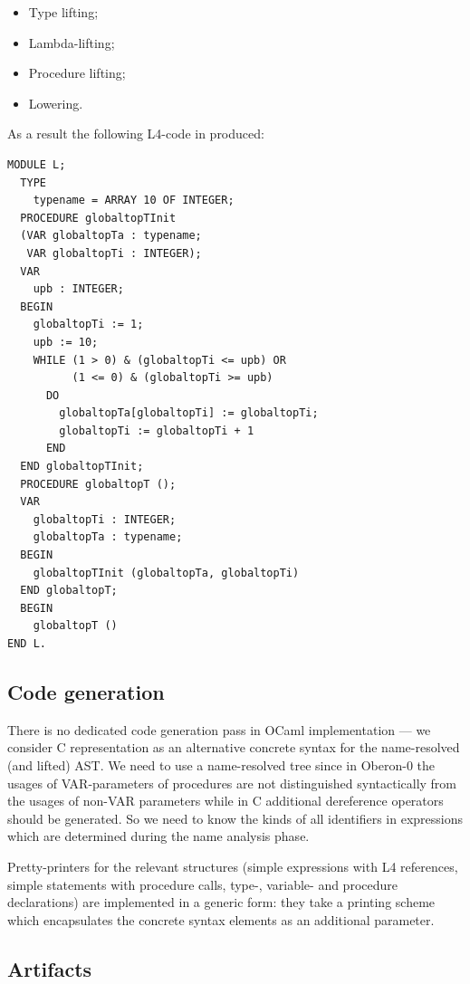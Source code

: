 \begin{itemize}
\item Type lifting;
\item Lambda-lifting;
\item Procedure lifting;
\item Lowering.
\end{itemize}

As a result the following L4-code in produced:

\begin{lstlisting}[language=oberon0]
MODULE L;
  TYPE
    typename = ARRAY 10 OF INTEGER;
  PROCEDURE globaltopTInit 
  (VAR globaltopTa : typename; 
   VAR globaltopTi : INTEGER);
  VAR
    upb : INTEGER;
  BEGIN
    globaltopTi := 1; 
    upb := 10; 
    WHILE (1 > 0) & (globaltopTi <= upb) OR 
          (1 <= 0) & (globaltopTi >= upb)
      DO
        globaltopTa[globaltopTi] := globaltopTi; 
        globaltopTi := globaltopTi + 1
      END
  END globaltopTInit;
  PROCEDURE globaltopT ();
  VAR
    globaltopTi : INTEGER;
    globaltopTa : typename;
  BEGIN
    globaltopTInit (globaltopTa, globaltopTi)
  END globaltopT;
  BEGIN
    globaltopT ()
END L.
\end{lstlisting}

\subsection{Code generation}

There is no dedicated code generation pass in OCaml implementation --- we consider C representation
as an alternative concrete syntax for the name-resolved (and lifted) AST. We need to use a name-resolved
tree since in Oberon-0 the usages of VAR-parameters of procedures are not distinguished syntactically from the usages
of non-VAR parameters while in C additional dereference operators should be generated. So we need to know
the kinds of all identifiers in expressions which are determined during the name analysis phase.

Pretty-printers for the relevant structures (simple expressions with L4 references, simple statements with procedure calls, 
type-, variable- and procedure declarations) are implemented in a generic form: they take a
printing scheme which encapsulates the concrete syntax elements as an additional parameter. 

\subsection{Artifacts}

